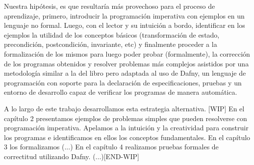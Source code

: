 \documentclass[12pt, a4paper, openany, fleqn]{book}
\begin{document}
    Nuestra hipótesis, es que resultaría más provechoso para el proceso de aprendizaje, primero, introducir la programación imperativa con ejemplos en un lenguaje no formal. Luego, con el lector y su intuición a bordo, identificar en los ejemplos la utilidad de los conceptos básicos (transformación de estado, precondición, postcondición, invariante, etc) y finalmente proceder a la formalización de los mismos para luego poder probar (formalmente), la corrección de los programas obtenidos y resolver problemas más complejos asistidos por una metodología similar a la del libro pero adaptada al uso de Dafny, un lenguaje de programación con soporte para la declaración de especificaciones, pruebas y un entorno de desarrollo capaz de verificar los programas de manera automática.

    A lo largo de este trabajo desarrollamos esta estrategia alternativa.
    [WIP]
    En el capítulo 2 presentamos ejemplos de problemas simples que pueden resolverse con programación imperativa. Apelamos a la intuición y la creatividad para construir los programas e identificamos en ellos los conceptos fundamentales.
    En el capítulo 3 los formalizamos (...)
    En el capítulo 4 realizamos pruebas formales de correctitud utilizando Dafny. (...)[END-WIP]

    
    
\end{document}

